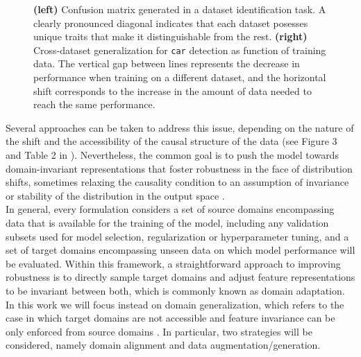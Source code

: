 \begin{figure}[H]
\begin{subfigure}[b]{0.32\textwidth}
    \end{subfigure}
       \caption{
        \textbf{(left)} Confusion matrix generated in a dataset
        identification task. A clearly pronounced diagonal 
        indicates that each dataset posesses unique traits that
        make it distinguishable from the rest.
        \textbf{(right)} Cross-dataset generalization
        for \texttt{car} detection as function of training data. 
        The vertical gap between lines represents the decrease in performance 
        when training on a different dataset, and the horizontal 
        shift corresponds to the increase in the amount of data needed 
        to reach the same performance.
        \cite{torralbaUnbiasedLookDataset2011}}
       \label{fig:dataset_bias}
\end{figure}

Several approaches can be taken to address this issue, depending
on the nature of the shift and the accessibility of the
causal structure of the data (see Figure 3 and Table 2 in 
\cite{wangGeneralizingUnseenDomains2022}).
Nevertheless, the common goal is to push the model towards
domain-invariant representations that foster robustness in the
face of distribution shifts, sometimes relaxing the causality condition
to an assumption of invariance or stability of the distribution in the output space
\cite{wangGeneralizingUnseenDomains2022,liuOutOfDistributionGeneralizationSurvey2023}. \\

In general, every formulation considers a set of source domains 
encompassing data that is available for the training of the model,
including any validation subsets used for model selection, 
regularization or hyperparameter tuning, and a set of target 
domains encompassing unseen data on which model performance will
be evaluated. Within this framework, a straightforward approach
to improving robustness is to directly sample target domains
and adjust feature representations to be invariant 
between both, which is commonly known as domain adaptation. \\

In this work we will focus instead on domain generalization, which 
refers to the case in which target domains are not accessible 
and feature invariance can be only enforced
from source domains
\cite{blanchardGeneralizingSeveralRelated}. In particular, two strategies will be considered, 
namely domain alignment and data augmentation/generation. \\

